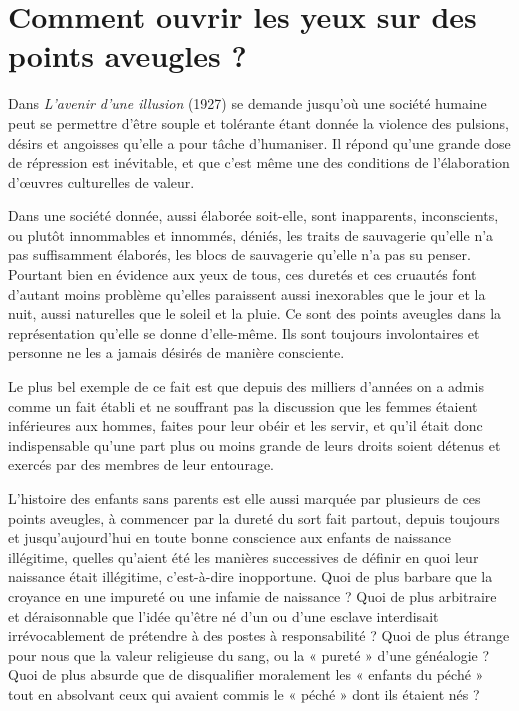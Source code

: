 
 \section{Comment ouvrir les yeux sur des points aveugles ?} 
 
 Dans \emph{L'avenir d'une illusion} (1927)  se demande jusqu'où une société humaine peut se permettre d'être souple et tolérante étant donnée la violence des pulsions, désirs et angoisses qu'elle a pour tâche d'humaniser. Il répond qu'une grande dose de répression est inévitable, et que c'est même une des conditions de l'élaboration d'œuvres culturelles de valeur.

 Dans une société donnée, aussi élaborée soit-elle, sont inapparents, inconscients, ou plutôt innommables et innommés, déniés, les traits de sauvagerie qu'elle n'a pas suffisamment élaborés, les blocs de sauvagerie qu'elle n'a pas su penser. Pourtant bien en évidence aux yeux de tous, ces duretés et ces cruautés font d'autant moins problème qu'elles paraissent aussi inexorables que le jour et la nuit, aussi naturelles que le soleil et la pluie. Ce sont des points aveugles dans la représentation qu'elle se donne d'elle-même. Ils sont toujours involontaires et personne ne les a jamais désirés de manière consciente. 

 Le plus bel exemple de ce fait est que depuis des milliers d'années on a admis comme un fait établi et ne souffrant pas la discussion que les femmes étaient inférieures aux hommes, faites pour leur obéir et les servir, et qu'il était donc indispensable qu'une part plus ou moins grande de leurs droits soient détenus et exercés par des membres de leur entourage. 

 L'histoire des enfants sans parents est elle aussi marquée par plusieurs de ces points aveugles, à commencer par la dureté du sort fait partout, depuis toujours et jusqu'aujourd'hui en toute bonne conscience aux enfants de naissance illégitime, quelles qu'aient été les manières successives de définir en quoi leur naissance était illégitime, c'est-à-dire inopportune. Quoi de plus barbare que la croyance en une impureté ou une infamie de naissance ? Quoi de plus arbitraire et déraisonnable que l'idée qu'être né d'un ou d'une esclave interdisait irrévocablement de prétendre à des postes à responsabilité ? Quoi de plus étrange pour nous que la valeur religieuse du sang, ou la « pureté » d'une généalogie ? Quoi de plus absurde que de disqualifier moralement les « enfants du péché » tout en absolvant ceux qui avaient commis le « péché » dont ils étaient nés ? 


